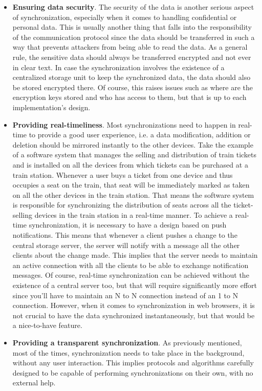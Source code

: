 \begin{itemize}
  \item \textbf{Ensuring data security}. The security of the data is another serious aspect of synchronization, especially when it comes to handling confidential or personal data. This is usually another thing that falls into the responsibility of the communication protocol since the data should be transferred in such a way that prevents attackers from being able to read the data. As a general rule, the sensitive data should always be transferred encrypted and not ever in clear text. In case the synchronization involves the existence of a centralized storage unit to keep the synchronized data, the data should also be stored encrypted there. Of course, this raises issues such as where are the encryption keys stored and who has access to them, but that is up to each implementation's design.

  \item \textbf{Providing real-timeliness}. Most synchronizations need to happen in real-time to provide a good user experience, i.e. a data modification, addition or deletion should be mirrored instantly to the other devices. Take the example of a software system that manages the selling and distribution of train tickets and is installed on all the devices from which tickets can be purchased at a train station. Whenever a user buys a ticket from one device and thus occupies a seat on the train, that seat will be immediately marked as taken on all the other devices in the train station. That means the software system is responsible for synchronizing the distribution of seats across all the ticket-selling devices in the train station in a real-time manner. To achieve a real-time synchronization, it is necessary to have a design based on push notifications. This means that whenever a client pushes a change to the central storage server, the server will notify with a message all the other clients about the change made. This implies that the server needs to maintain an active connection with all the clients to be able to exchange notification messages. Of course, real-time synchronization can be achieved without the existence of a central server too, but that will require significantly more effort since you'll have to maintain an N to N connection instead of an 1 to N connection. However, when it comes to synchronization in web browsers, it is not crucial to have the data synchronized instantaneously, but that would be a nice-to-have feature.

  \item \textbf{Providing a transparent synchronization}. As previously mentioned, most of the times, synchronization needs to take place in the background, without any user interaction. This implies protocols and algorithms carefully designed to be capable of performing synchronizations on their own, with no external help.
\end{itemize}

